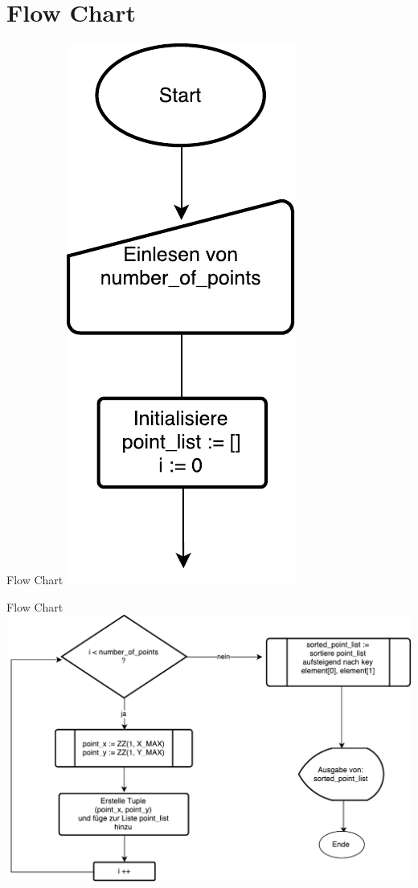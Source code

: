 \section{Flow Chart}
\begin{frame}{Flow Chart}
	\centering
  	\includegraphics[scale=0.4]{BSP03_Flow_Chart_1.pdf}
\end{frame}
\begin{frame}{Flow Chart}
	\centering
  	\includegraphics[scale=0.4]{BSP03_Flow_Chart_2.pdf}
\end{frame}

